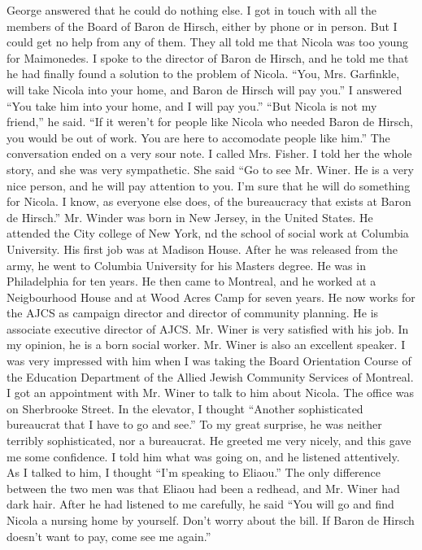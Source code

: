 George answered that he could do nothing else.
I got in touch with all the members of the Board of Baron de Hirsch, either by phone or in person.
But I could get no help from any of them.
They all told me that Nicola was too young for Maimonedes.
I spoke to the director of Baron de Hirsch, and he told me that he had finally found a solution to the problem of Nicola.
“You, Mrs.
Garfinkle, will take Nicola into your home, and Baron de Hirsch will pay you.”
I answered “You take him into your home, and I will pay you.”
“But Nicola is not my friend,” he said.
“If it weren’t for people like Nicola who needed Baron de Hirsch, you would be out of work.
You are here to accomodate people like him.” The conversation ended on a very sour note.
I called Mrs.
Fisher.
I told her the whole story, and she was very sympathetic.
She said “Go to see Mr.
Winer.
He is a very nice person, and he will pay attention to you.
I’m sure that he will do something for Nicola.
I know, as everyone else does, of the bureaucracy that exists at Baron de Hirsch.”
Mr.
Winder was born in New Jersey, in the United States.
He attended the City college of New York, nd the school of social work at Columbia University.
His first job was at Madison House.
After he was released from the army, he went to Columbia University for his Masters degree.
He was in Philadelphia for ten years.
He then came to Montreal, and he worked at a Neigbourhood House and at Wood Acres Camp for seven years.
He now works for the AJCS as campaign director and director of community planning.
He is associate executive director of AJCS.
Mr.
Winer is very satisfied with his job.
In my opinion, he is a born social worker.
Mr.
Winer is also an excellent speaker.
I was very impressed with him when I was taking the Board Orientation Course of the Education Department of the Allied Jewish Community Services of Montreal.
I got an appointment with Mr.
Winer to talk to him about Nicola.
The office was on Sherbrooke Street.
In the elevator, I thought “Another sophisticated bureaucrat that I have to go and see.” To my great surprise, he was neither terribly sophisticated, nor a bureaucrat.
He greeted me very nicely, and this gave me some confidence.
I told him what was going on, and he listened attentively.
As I talked to him, I thought “I’m speaking to Eliaou.” The only difference between the two men was that Eliaou had been a redhead, and Mr.
Winer had dark hair.
After he had listened to me carefully, he said “You will go and find Nicola a nursing home by yourself.
Don’t worry about the bill.
If Baron de Hirsch doesn’t want to pay, come see me again.”
